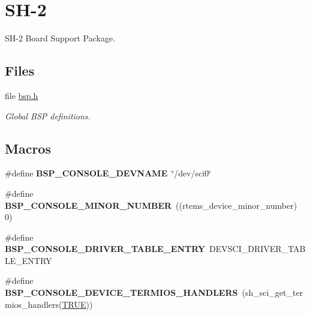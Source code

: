 \hypertarget{group__RTEMSBSPsSH2}{}\section{S\+H-\/2}
\label{group__RTEMSBSPsSH2}


S\+H-\/2 Board Support Package.  


\subsection*{Files}
\begin{DoxyCompactItemize}
\item 
file \mbox{\hyperlink{bsps_2sh_2gensh2_2include_2bsp_8h}{bsp.\+h}}
\begin{DoxyCompactList}\small\item\em Global B\+SP definitions. \end{DoxyCompactList}\end{DoxyCompactItemize}
\subsection*{Macros}
\begin{DoxyCompactItemize}
\item 
\mbox{\label{group__RTEMSBSPsSH2_ga3aad321c9e47ba2afe85c042fc28116a}} 
\#define {\bfseries B\+S\+P\+\_\+\+C\+O\+N\+S\+O\+L\+E\+\_\+\+D\+E\+V\+N\+A\+ME}~\char`\"{}/dev/sci0\char`\"{}
\item 
\mbox{\label{group__RTEMSBSPsSH2_ga43996e3f45ddc2a9784f4a15eb783082}} 
\#define {\bfseries B\+S\+P\+\_\+\+C\+O\+N\+S\+O\+L\+E\+\_\+\+M\+I\+N\+O\+R\+\_\+\+N\+U\+M\+B\+ER}~((rtems\+\_\+device\+\_\+minor\+\_\+number) 0)
\item 
\mbox{\label{group__RTEMSBSPsSH2_ga7a07e7d7ae2a04a1fa54b48d261a82bf}} 
\#define {\bfseries B\+S\+P\+\_\+\+C\+O\+N\+S\+O\+L\+E\+\_\+\+D\+R\+I\+V\+E\+R\+\_\+\+T\+A\+B\+L\+E\+\_\+\+E\+N\+T\+RY}~D\+E\+V\+S\+C\+I\+\_\+\+D\+R\+I\+V\+E\+R\+\_\+\+T\+A\+B\+L\+E\+\_\+\+E\+N\+T\+RY
\item 
\mbox{\label{group__RTEMSBSPsSH2_ga466272071eaf284b3c7412d9ba914d2b}} 
\#define {\bfseries B\+S\+P\+\_\+\+C\+O\+N\+S\+O\+L\+E\+\_\+\+D\+E\+V\+I\+C\+E\+\_\+\+T\+E\+R\+M\+I\+O\+S\+\_\+\+H\+A\+N\+D\+L\+E\+RS}~(sh\+\_\+sci\+\_\+get\+\_\+termios\+\_\+handlers(\mbox{\hyperlink{group__RTEMSScoreBaseDefs_gaa8cecfc5c5c054d2875c03e77b7be15d}{T\+R\+UE}}))
\end{DoxyCompactItemize}
